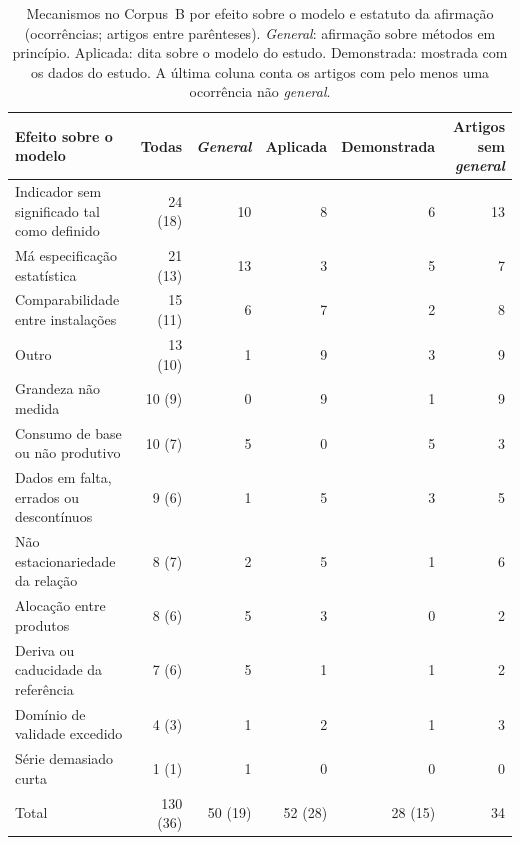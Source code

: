 \begin{table}[htbp]
  \centering
  \footnotesize
  \caption[Mecanismos por efeito e estatuto da afirmação]{Mecanismos no
  Corpus~B por efeito sobre o modelo e estatuto da afirmação (ocorrências;
  artigos entre parênteses). \emph{General}: afirmação sobre métodos em
  princípio. Aplicada: dita sobre o modelo do estudo. Demonstrada: mostrada
  com os dados do estudo. A última coluna conta os artigos com pelo menos uma
  ocorrência não \emph{general}.}
  \label{tab:b-mecanismos}
  \begin{tabular}{lrrrrr}
    \toprule
    Efeito sobre o modelo & Todas & \emph{General} & Aplicada & Demonstrada & Artigos sem \emph{general} \\
    \midrule
    Indicador sem significado tal como definido & 24 (18) & 10 & 8 & 6 & 13 \\
    Má especificação estatística & 21 (13) & 13 & 3 & 5 & 7 \\
    Comparabilidade entre instalações & 15 (11) & 6 & 7 & 2 & 8 \\
    Outro & 13 (10) & 1 & 9 & 3 & 9 \\
    Grandeza não medida & 10 (9) & 0 & 9 & 1 & 9 \\
    Consumo de base ou não produtivo & 10 (7) & 5 & 0 & 5 & 3 \\
    Dados em falta, errados ou descontínuos & 9 (6) & 1 & 5 & 3 & 5 \\
    Não estacionariedade da relação & 8 (7) & 2 & 5 & 1 & 6 \\
    Alocação entre produtos & 8 (6) & 5 & 3 & 0 & 2 \\
    Deriva ou caducidade da referência & 7 (6) & 5 & 1 & 1 & 2 \\
    Domínio de validade excedido & 4 (3) & 1 & 2 & 1 & 3 \\
    Série demasiado curta & 1 (1) & 1 & 0 & 0 & 0 \\
    \midrule
    Total & 130 (36) & 50 (19) & 52 (28) & 28 (15) & 34 \\
    \bottomrule
  \end{tabular}
\end{table}

